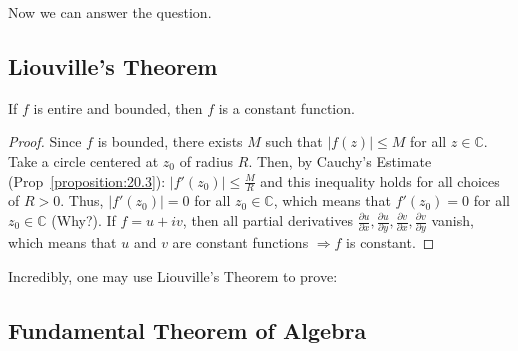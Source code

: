 Now we can answer the question.
\subsection{Liouville's Theorem}

\begin{theorem}\label{theorem:Liouville.20.4}
    If $f$ is entire and bounded, then $f$ is a constant function.
\end{theorem}
\begin{proof}

Since $f$ is bounded, there exists $M$ such that $|f(z)| \le M$ for all $z \in \mathbb{C}$. 
Take a circle centered at $z_0$ of radius $R$. Then, by Cauchy's Estimate (Prop~\ref{proposition:20.3}): $|f'(z_0)| \le \frac{M}{R}$ and this inequality holds for all choices of $R > 0$. 
Thus, $|f'(z_0)| = 0$ for all $z_0 \in \mathbb{C}$, which means that $f'(z_0) = 0$ for all $z_0 \in \mathbb{C}$ (Why?). If $f = u + iv$, 
then all partial derivatives $\frac{\partial u}{\partial x}, \frac{\partial u}{\partial y}, \frac{\partial v}{\partial x}, \frac{\partial v}{\partial y}$ vanish, 
which means that $u$ and $v$ are constant functions $\Rightarrow f$ is constant.
    
\end{proof}
    Incredibly, one may use Liouville's Theorem to prove:
\subsection{Fundamental Theorem of Algebra}

